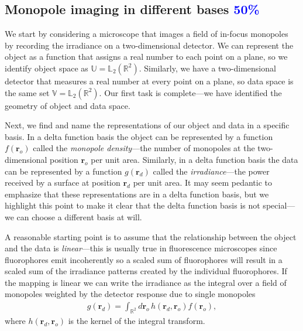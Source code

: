 \documentclass{osa-article}
\providecommand{\ro}{\mathbf{\mathbf{r}}_o}
\providecommand{\rd}{\mathbf{r}_d}
\providecommand{\mbb}[1]{\mathbb{#1}}
\providecommand{\tb}[1]{\textcolor{blue}{#1}}
\begin{document}
\subsection{Monopole imaging in different bases \tb{50\%}}\label{sec:monopole}
We start by considering a microscope that images a field of in-focus monopoles
by recording the irradiance on a two-dimensional detector. We can represent
the object as a function that assigns a real number to each point on a plane,
so we identify object space as $\mbb{U} = \mbb{L}_2(\mbb{R}^2)$. Similarly, we
have a two-dimensional detector that measures a real number at every point on 
a plane, so data space is the same set $\mbb{V} = \mbb{L}_2(\mbb{R}^2)$. Our
first task is complete---we have identified the geometry of object and data
space.

Next, we find and name the representations of our object and data in a
specific basis. In a delta function basis the object can be represented by a
function $f(\ro)$ called the \textit{monopole density}---the number of
monopoles at the two-dimensional position $\ro$ per unit area. Similarly, in a
delta function basis the data can be represented by a function $g(\rd)$ called
the \textit{irradiance}---the power received by a surface at position $\rd$
per unit area. It may seem pedantic to emphasize that these representations
are in a delta function basis, but we highlight this point to make it clear
that the delta function basis is not special---we can choose a different basis
at will.


A reasonable starting point is to assume that the relationship between the
object and the data is \textit{linear}---this is usually true in fluorescence
microscopes since fluorophores emit incoherently so a scaled sum of fluorophores
will result in a scaled sum of the irradiance patterns created by the individual
fluorophores. If the mapping is linear we can write the irradiance as the
integral over a field of monopoles weighted by the detector response due to
single monopoles
\begin{align}
g(\rd) = \int_{\mbb{R}^2}d\ro\, h(\rd,\ro)f(\ro), \label{eq:fwdmono}
\end{align}
where $h(\rd{}, \ro{})$ is the kernel of the integral transform. 
\end{document}
